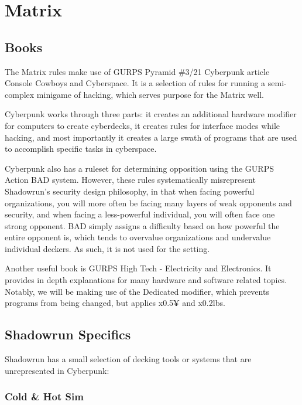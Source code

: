 \section{Matrix}

\begin{multicols}{3}
	
	\subsection{Books}
	
	The Matrix rules make use of GURPS Pyramid \#3/21 Cyberpunk article Console Cowboys and Cyberspace. It is a selection of rules for running a semi-complex minigame of hacking, which serves purpose for the Matrix well.
	
	Cyberpunk works through three parts: it creates an additional hardware modifier for computers to create cyberdecks, it creates rules for interface modes while hacking, and most importantly it creates a large swath of programs that are used to accomplish specific tasks in cyberspace.
	
	Cyberpunk also has a ruleset for determining opposition using the GURPS Action BAD system. However, these rules systematically misrepresent Shadowrun's security design philosophy, in that when facing powerful organizations, you will more often be facing many layers of weak opponents and security, and when facing a less-powerful individual, you will often face one strong opponent. BAD simply assigns a difficulty based on how powerful the entire opponent is, which tends to overvalue organizations and undervalue individual deckers. As such, it is not used for the setting.
	
	Another useful book is GURPS High Tech - Electricity and Electronics. It provides in depth explanations for many hardware and software related topics. Notably, we will be making use of the Dedicated modifier, which prevents programs from being changed, but applies x0.5¥ and x0.2lbs. 
	
	\subsection{Shadowrun Specifics}
	
	Shadowrun has a small selection of decking tools or systems that are unrepresented in Cyberpunk:
	
	\subsubsection{Cold \& Hot Sim}\label{sim_mode}
	

\end{multicols}
